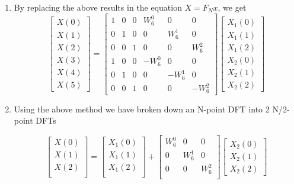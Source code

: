 \documentclass[journal,12pt,twocolumn]{IEEEtran}
\renewcommand\thesection{\arabic{section}}
\begin{document}
\begin{enumerate}[label=\thesection.\arabic*.,ref=\thesection.\theenumi]
\item
By replacing the above results in the equation $X = F_{N} x$, we get
\begin{equation}
\begin{bmatrix}
X(0) \\ 
X(1) \\ 
X(2) \\ 
X(3) \\ 
X(4) \\ 
X(5) 
\end{bmatrix}
=
\begin{bmatrix}
1 & 0 & 0 & W^{0}_{6} & 0 & 0\\
0 & 1 & 0 &  0 & W^{1}_{6} & 0\\
0 & 0 & 1 & 0 & 0 & W^{2}_{6}\\
1 & 0 & 0 & -W^{0}_{6} & 0 & 0\\
0 & 1 & 0 & 0 & -W^{1}_{6} & 0\\
0 & 0 & 1 & 0 & 0 & -W^{2}_{6}
\end{bmatrix}
\begin{bmatrix}
X_{1}(0) \\ 
X_{1}(1)\\ 
X_{1}(2)\\ 
X_{2}(0) \\ 
X_{2}(1) \\ 
X_{2}(2)
\end{bmatrix}  
\end{equation}

\item Using the above method we have broken down an N-point DFT into 2 N/2-point DFTs

\begin{equation}
\begin{bmatrix}
X(0) \\ 
X(1) \\ 
X(2) \\ 
\end{bmatrix}
=
\begin{bmatrix}
X_{1}(0) \\ 
X_{1}(1)\\ 
X_{1}(2)\\
\end{bmatrix}
+
\begin{bmatrix}
W^{0}_{6} & 0 & 0\\
0 & W^{1}_{6} & 0\\
0 & 0 & W^{2}_{6}\\
\end{bmatrix}
\begin{bmatrix}
X_{2}(0) \\ 
X_{2}(1) \\ 
X_{2}(2)
\end{bmatrix}
\end{equation}


\end{enumerate}
\end{document}
